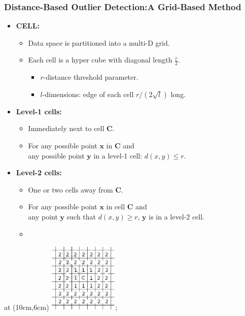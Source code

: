 \begin{frame}
  \frametitle{Distance-Based Outlier Detection:A Grid-Based Method}
  \begin{itemize}
  \item \textbf{CELL:}
    \begin{itemize}
    \item Data space is partitioned into a multi-D grid.
    \item Each cell is a hyper cube with diagonal length $\frac{r}{2}$.
      \begin{itemize}
      \item $r$-distance threshold parameter.
      \item $l$-dimensions: edge of each cell $r / (2\sqrt{l})$ long.
      \end{itemize}
    \end{itemize}
  \item \textbf{Level-1 cells:}
    \begin{itemize}
    \item Immediately next to cell $\mathbf{C}$.
    \item For any possible point $\mathbf{x}$ in $\mathbf{C}$ and \\
      any possible point $\mathbf{y}$ in a level-1 cell: $d(x,y) \leq r$.
    \end{itemize}
  \item \textbf{Level-2 cells:}
    \begin{itemize}
    \item One or two cells away from $\mathbf{C}$.
    \item For any possible point $\mathbf{x}$ in cell $\mathbf{C}$ and \\
      any point $\mathbf{y}$ such that $d(x,y) \geq r$, $\mathbf{y}$ is in a level-2 cell.
    \item
    \end{itemize}
  \end{itemize}
  \tikzoverlay at (10cm,6cm) {\includegraphics[width=0.25\textwidth]{img/grid8.png}};
\end{frame}


